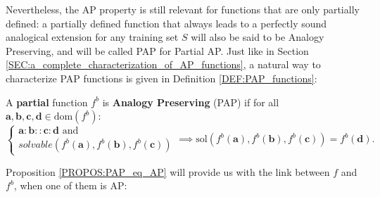 Nevertheless, the AP property is still relevant for functions that are only
partially defined: a partially defined function that always leads to a perfectly
sound analogical extension for any training set $S$ will also be said to be
Analogy Preserving, and will be called PAP for Partial AP. Just like in Section
\ref{SEC:a_complete_characterization_of_AP_functions}, a natural way to
characterize PAP functions is given in Definition \ref{DEF:PAP_functions}:

\begin{definition}
  \label{DEF:PAP_functions}
  A \textbf{partial} function $f^b$ is {\bf Analogy Preserving} (PAP)
  if for all $\mathbf{a}, \mathbf{b}, \mathbf{c}, \mathbf{d} \in
  \text{dom}(f^b)$:
  $$
  \begin{cases}
    \mathbf{a} :  \mathbf{b} ::  \mathbf{c} :  \mathbf{d} \text{ and }\\
    solvable(f^b(\mathbf{a}),f^b(\mathbf{b}),f^b(\mathbf{c}))
  \end{cases}
  \implies \text{sol}(f^b(\mathbf{a}),f^b(\mathbf{b}),f^b(\mathbf{c})) =
  f^b(\mathbf{d}).
  $$
\end{definition}

Proposition \ref{PROPOS:PAP_eq_AP} will provide us with the link between $f$
and $f^b$, when one of them is AP:

